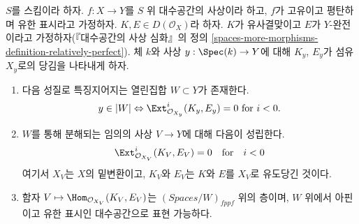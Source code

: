 \begin{lemma}
\label{lemma-complexes-open-neg-exts-vanishing}
$S$를 스킴이라 하자. $f : X \to Y$를 $S$ 위 대수공간의 사상이라 하고,
$f$가 고유이고 평탄하며 유한 표시라고 가정하자.
$K, E \in D(\mathcal{O}_X)$라 하자. $K$가 유사결맞이고 $E$가
$Y$-완전이라고 가정하자(『대수공간의 사상 심화』의 정의
\ref{spaces-more-morphisms-definition-relatively-perfect}).
체 $k$와 사상 $y : \Spec(k) \to Y$에 대해 $K_y$, $E_y$가 섬유 $X_y$로의
당김을 나타내게 하자.
\begin{enumerate}
\item 다음 성질로 특징지어지는 열린집합 $W \subset Y$가 존재한다.
$$
y \in |W|
\Leftrightarrow
\Ext^i_{\mathcal{O}_{X_y}}(K_y, E_y) = 0
\text{ for }i < 0.
$$
\item $W$를 통해 분해되는 임의의 사상 $V \to Y$에 대해 다음이 성립한다.
$$
\Ext^i_{\mathcal{O}_{X_V}}(K_V, E_V) = 0
\quad\text{for}\quad i < 0
$$
여기서 $X_V$는 $X$의 밑변환이고, $K_V$와 $E_V$는 $K$와 $E$를 $X_V$로
유도당긴 것이다.
\item 함자 $V \mapsto \Hom_{\mathcal{O}_{X_V}}(K_V, E_V)$는
$(\textit{Spaces}/W)_{fppf}$ 위의 층이며, $W$ 위에서 아핀이고 유한 표시인
대수공간으로 표현 가능하다.
\end{enumerate}
\end{lemma}


